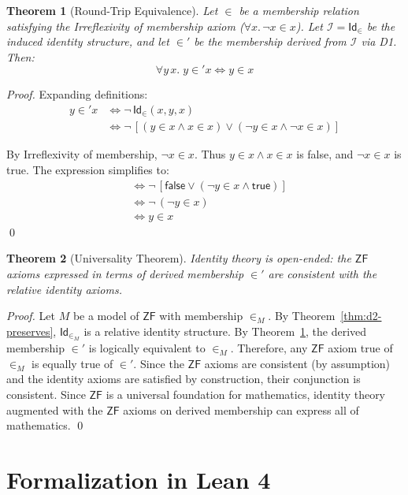 \documentclass{ws-rv9x6}
\newtheorem{theorem}{Theorem}[section]
\theoremstyle{remark}
\newcommand{\Id}{\mathsf{Id}}
\newcommand{\RI}{\mathcal{I}}
\newcommand{\ZF}{\mathsf{ZF}}
\begin{document}
\begin{theorem}[Round-Trip Equivalence]
\label{thm:roundtrip}
Let $\in$ be a membership relation satisfying the Irreflexivity of membership axiom ($\forall x.\, \neg x \in x$). Let $\RI = \Id_\in$ be the induced identity structure, and let $\in'$ be the membership derived from $\RI$ via D1. Then:
\[
\forall y\, x.\; y \in' x \iff y \in x
\]
\end{theorem}

\begin{proof}
Expanding definitions:
\begin{align*}
y \in' x &\iff \neg\, \Id_\in(x, y, x) \\
&\iff \neg\, [(y \in x \land x \in x) \lor (\neg y \in x \land \neg x \in x)]
\end{align*}

By Irreflexivity of membership, $\neg x \in x$. Thus $y \in x \land x \in x$ is false, and $\neg x \in x$ is true. The expression simplifies to:
\begin{align*}
&\iff \neg\, [\mathsf{false} \lor (\neg y \in x \land \mathsf{true})] \\
&\iff \neg\, (\neg y \in x) \\
&\iff y \in x
\end{align*}
\qed
\end{proof}

\begin{theorem}[Universality Theorem]
\label{thm:universality}
Identity theory is open-ended: the $\ZF$ axioms expressed in terms of derived membership $\in'$ are consistent with the relative identity axioms.
\end{theorem}

\begin{proof}
Let $M$ be a model of $\ZF$ with membership $\in_M$. By Theorem~\ref{thm:d2-preserves}, $\Id_{\in_M}$ is a relative identity structure. By Theorem~\ref{thm:roundtrip}, the derived membership $\in'$ is logically equivalent to $\in_M$. Therefore, any $\ZF$ axiom true of $\in_M$ is equally true of $\in'$. Since the $\ZF$ axioms are consistent (by assumption) and the identity axioms are satisfied by construction, their conjunction is consistent. Since $\ZF$ is a universal foundation for mathematics, identity theory augmented with the $\ZF$ axioms on derived membership can express all of mathematics.
\qed
\end{proof}

\section{Formalization in Lean 4}
\end{document}
